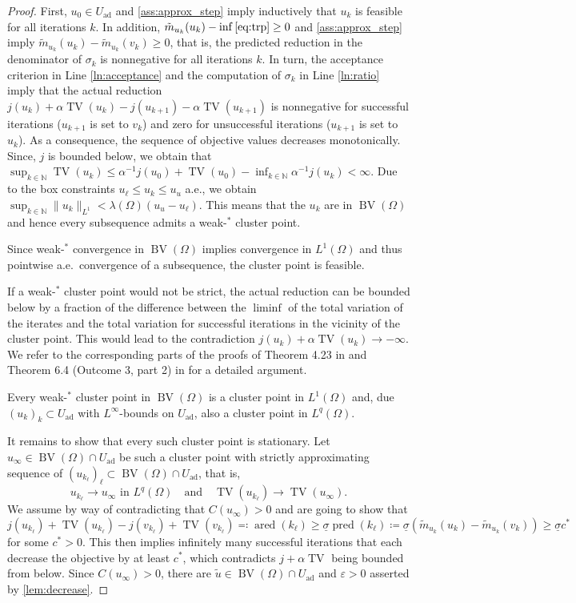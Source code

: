 \documentclass[11pt]{article}
\newcommand{\N}{\mathbb{N}}
\DeclareMathOperator*{\BV}{BV}
\DeclareMathOperator*{\TV}{TV}
\DeclareMathOperator*{\pred}{pred}
\DeclareMathOperator*{\ared}{ared}
\newcommand{\feas}{U_{\textrm{ad}}}
\theoremstyle{definition}
\theoremstyle{remark}
\begin{document}
\begin{proof}
First, $u_0 \in \feas$ and 
\cref{ass:approx_step} imply inductively
that $u_k$ is feasible for all iterations $k$.
In addition,
$\tilde{m}_{u_k}(u_k) - \inf \eqref{eq:trp} \ge 0$ 
and \cref{ass:approx_step} imply
$\tilde{m}_{u_k}(u_k) - \tilde{m}_{u_k}(v_k) \ge 0$,
that is, the predicted reduction in the denominator
of $\sigma_k$ is nonnegative for all iterations
$k$. In turn, the acceptance criterion in Line
\ref{ln:acceptance} and the computation of $\sigma_k$ 
in Line \ref{ln:ratio} imply that the actual 
reduction $j(u_k) + \alpha \TV(u_k) - j(u_{k+1}) - 
\alpha \TV(u_{k+1})$ is nonnegative for successful 
iterations ($u_{k+1}$ is set to $v_k$)
and zero for unsuccessful iterations ($u_{k+1}$
is set to $u_k$). As a consequence, the sequence of 
objective values decreases monotonically.
Since, $j$ is bounded below, we obtain that $\sup_{k \in \N} \TV(u_k) \le \alpha^{-1}j(u_0) + \TV(u_0) - \inf_{k \in \N} \alpha^{-1}j(u_k) < \infty$.
Due to the box constraints $u_\ell \le u_k \le u_u$
a.e., we obtain $\sup_{k\in \N} \|u_k\|_{L^1} < \lambda(\Omega)(u_u - u_\ell)$. This means that
the $u_k$ are in $\BV(\Omega)$ and hence every subsequence admits a weak-$^*$ cluster point.

Since weak-$^*$ convergence in $\BV(\Omega)$
implies convergence in $L^1(\Omega)$ and thus
pointwise a.e.\ convergence of a subsequence,
the cluster point is feasible.

If a weak-$^*$ cluster point would not be strict,
the actual reduction can be
bounded below by a fraction of the difference
between the $\liminf$ of the total variation of
the iterates and the total variation for successful
iterations in the vicinity of the cluster point. 
This would lead to the contradiction
$j(u_k) + \alpha \TV(u_k) \to -\infty$. 
We refer to the corresponding parts of the
proofs of Theorem 4.23 in  
\cite{leyffer2022sequential}
and Theorem 6.4
(Outcome 3, part 2) in \cite{manns2023integer}
for a detailed argument.

Every weak-$^*$ cluster point in $\BV(\Omega)$
is a cluster point in $L^1(\Omega)$ and,
due $(u_k)_k \subset \feas$ with $L^\infty$-bounds
on $\feas$, also a cluster point in $L^q(\Omega)$.

It remains to show that every such cluster point is
stationary. Let $u_\infty \in \BV(\Omega) \cap \feas$
be such a cluster point with strictly approximating 
sequence of $(u_{k_\ell})_\ell \subset \BV(\Omega) \cap \feas$, that is,
%
\[ u_{k_\ell} \to u_\infty \text{ in } L^q(\Omega)
\quad\text{and}\quad \TV(u_{k_\ell}) \to \TV(u_\infty).
\]
%
We assume by way of contradicting that
$C(u_\infty) > 0$ and are going to show that
%
\[ j(u_{k_\ell}) + \TV(u_{k_\ell})
   - j(v_{k_\ell}) + \TV(v_{k_\ell})
   \eqqcolon \ared(k_\ell)
   \ge \underline{\sigma}
   \pred(k_\ell)
   \coloneqq
   \underline{\sigma}(\tilde{m}_{u_k}(u_k) - \tilde{m}_{u_k}(v_k))
   \ge \underline{\sigma}c^*
\]
%
for some $c^* > 0$. This then implies infinitely
many successful iterations that
each decrease the objective by at least $c^*$,
which contradicts $j + \alpha \TV$ being bounded
from below. Since $C(u_\infty) > 0$, there are
$\tilde{u} \in \BV(\Omega) \cap \feas$ and $\varepsilon > 0$ asserted by \cref{lem:decrease}.


\end{proof}
\end{document}
